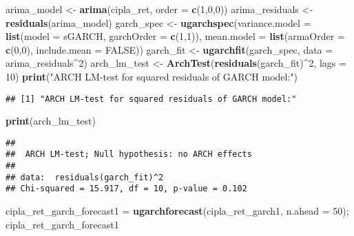 \documentclass[
]{article}
\newenvironment{Shaded}{\begin{snugshade}}{\end{snugshade}}
\newcommand{\AttributeTok}[1]{\textcolor[rgb]{0.13,0.29,0.53}{#1}}
\newcommand{\ConstantTok}[1]{\textcolor[rgb]{0.56,0.35,0.01}{#1}}
\newcommand{\DecValTok}[1]{\textcolor[rgb]{0.00,0.00,0.81}{#1}}
\newcommand{\FunctionTok}[1]{\textcolor[rgb]{0.13,0.29,0.53}{\textbf{#1}}}
\newcommand{\NormalTok}[1]{#1}
\newcommand{\OtherTok}[1]{\textcolor[rgb]{0.56,0.35,0.01}{#1}}
\newcommand{\SpecialCharTok}[1]{\textcolor[rgb]{0.81,0.36,0.00}{\textbf{#1}}}
\newcommand{\StringTok}[1]{\textcolor[rgb]{0.31,0.60,0.02}{#1}}
\begin{document}
\begin{Shaded}
\begin{Highlighting}[]
\NormalTok{arima\_model }\OtherTok{\textless{}{-}} \FunctionTok{arima}\NormalTok{(cipla\_ret, }\AttributeTok{order =} \FunctionTok{c}\NormalTok{(}\DecValTok{1}\NormalTok{,}\DecValTok{0}\NormalTok{,}\DecValTok{0}\NormalTok{))}
\NormalTok{arima\_residuals }\OtherTok{\textless{}{-}} \FunctionTok{residuals}\NormalTok{(arima\_model)}
\NormalTok{garch\_spec }\OtherTok{\textless{}{-}} \FunctionTok{ugarchspec}\NormalTok{(}\AttributeTok{variance.model =} \FunctionTok{list}\NormalTok{(}\AttributeTok{model =} \StringTok{\textquotesingle{}sGARCH\textquotesingle{}}\NormalTok{, }\AttributeTok{garchOrder =} \FunctionTok{c}\NormalTok{(}\DecValTok{1}\NormalTok{,}\DecValTok{1}\NormalTok{)), }
                         \AttributeTok{mean.model =} \FunctionTok{list}\NormalTok{(}\AttributeTok{armaOrder =} \FunctionTok{c}\NormalTok{(}\DecValTok{0}\NormalTok{,}\DecValTok{0}\NormalTok{), }\AttributeTok{include.mean =} \ConstantTok{FALSE}\NormalTok{))}
\NormalTok{garch\_fit }\OtherTok{\textless{}{-}} \FunctionTok{ugarchfit}\NormalTok{(garch\_spec, }\AttributeTok{data =}\NormalTok{ arima\_residuals}\SpecialCharTok{\^{}}\DecValTok{2}\NormalTok{)}
\NormalTok{arch\_lm\_test }\OtherTok{\textless{}{-}} \FunctionTok{ArchTest}\NormalTok{(}\FunctionTok{residuals}\NormalTok{(garch\_fit)}\SpecialCharTok{\^{}}\DecValTok{2}\NormalTok{, }\AttributeTok{lags =} \DecValTok{10}\NormalTok{)}
\FunctionTok{print}\NormalTok{(}\StringTok{"ARCH LM{-}test for squared residuals of GARCH model:"}\NormalTok{)}
\end{Highlighting}
\end{Shaded}

\begin{verbatim}
## [1] "ARCH LM-test for squared residuals of GARCH model:"
\end{verbatim}

\begin{Shaded}
\begin{Highlighting}[]
\FunctionTok{print}\NormalTok{(arch\_lm\_test)}
\end{Highlighting}
\end{Shaded}

\begin{verbatim}
## 
##  ARCH LM-test; Null hypothesis: no ARCH effects
## 
## data:  residuals(garch_fit)^2
## Chi-squared = 15.917, df = 10, p-value = 0.102
\end{verbatim}

\begin{Shaded}
\begin{Highlighting}[]
\NormalTok{cipla\_ret\_garch\_forecast1 }\OtherTok{=} \FunctionTok{ugarchforecast}\NormalTok{(cipla\_ret\_garch1, }\AttributeTok{n.ahead =} \DecValTok{50}\NormalTok{); }
\NormalTok{cipla\_ret\_garch\_forecast1}
\end{Highlighting}
\end{Shaded}
\end{document}
